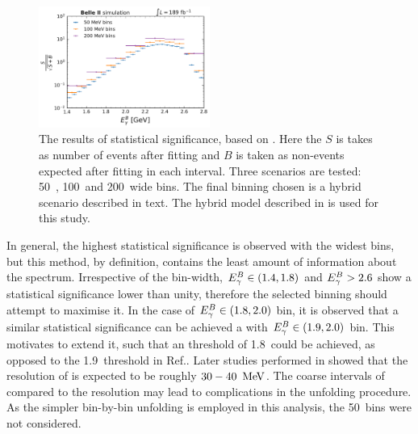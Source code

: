 \begin{figure}[htbp!]
    \centering
    \includegraphics[width=0.5\textwidth]{figures/fitting/binning_significance.pdf}
    \caption{\label{fig:binning_significance}The results of statistical significance, based on .
    Here the $S$ is takes as number of \BtoXsgamma events after fitting and $B$ is taken as non-\BtoXsgamma events expected after fitting in each \EB interval.
    Three scenarios are tested: 50~\mev, 100~\mev and 200~\mev wide bins.
    The final binning chosen is a hybrid scenario described in  text.
    The hybrid model described in  is used for this study.
    }    
\end{figure}

In general, the highest statistical significance is observed with the widest bins, but this method, by definition, contains the least amount of information about the spectrum.
Irrespective of the bin-width,  ${E^B_{\gamma}}\in(1.4,1.8)$ and ${E^B_{\gamma}}>2.6$ show a statistical significance lower than unity, therefore the selected binning should attempt to maximise it.
In the case of ${E^B_{\gamma}}\in(1.8,2.0)$ bin, it is observed that a similar statistical significance can be achieved a with ${E^B_{\gamma}}\in(1.9,2.0)$ bin.
This motivates to extend it, such that an \EB threshold of 1.8~\gev could be achieved, as opposed to the 1.9~\gev threshold in Ref.\cite{BaBar:2007yhb}.
Later studies performed in  showed that the resolution of \EB is expected to be roughly $30-40~\mathrm{\,Me\kern -0.1em V}$.
The coarse intervals of \EB compared to the resolution may lead to complications in the unfolding procedure.
As the simpler bin-by-bin unfolding is employed in this analysis, the 50~\mev bins were not considered.

